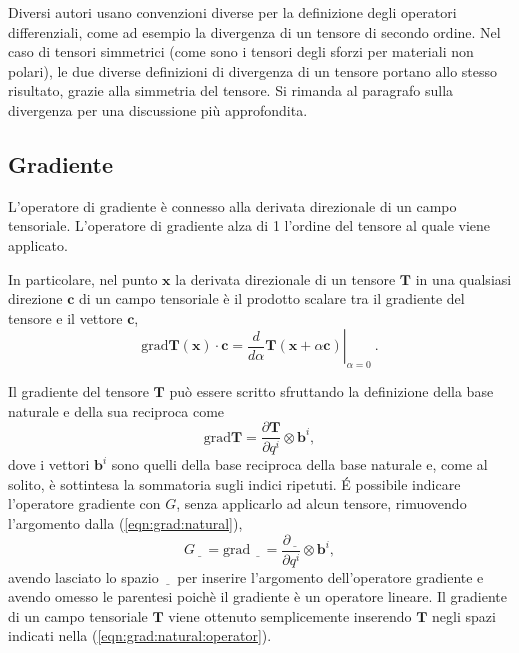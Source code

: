 \begin{remark}
 Diversi autori usano convenzioni diverse per la definizione degli operatori differenziali, come ad esempio la divergenza di un tensore di secondo ordine. Nel caso di tensori simmetrici (come sono i tensori degli sforzi per materiali non polari), le due diverse definizioni di divergenza di un tensore portano allo stesso risultato, grazie alla simmetria del tensore. Si rimanda al paragrafo sulla divergenza per una discussione più approfondita.
\end{remark}

\subsection{Gradiente}
L'operatore di gradiente è connesso alla derivata direzionale di un campo tensoriale.
L'operatore di gradiente alza di 1 l'ordine del tensore al quale viene applicato.
\begin{operator}[Gradiente] 
    In particolare, nel punto $\bm{x}$ la derivata direzionale di un tensore $\bm{T}$ in una qualsiasi direzione $\bm{c}$ di un campo tensoriale è il prodotto scalare tra il gradiente del tensore e il vettore $\bm{c}$,
 \begin{equation}\label{eqn:grad:def}
     \text{grad} \bm{T}(\bm{x}) \cdot \bm{c} = \left. \dfrac{d}{d\alpha} \bm{T}(\bm{x}+\alpha\bm{c})\right|_{\alpha=0} \ .
 \end{equation}
\end{operator}
%

\noindent
Il gradiente del tensore $\bm{T}$ può essere scritto sfruttando la definizione della base naturale e della sua reciproca come
 \begin{equation}\label{eqn:grad:natural}
  \text{grad} \bm{T} = \dfrac{\partial \bm{T}}{\partial q^i} \otimes \bm{b}^i ,
 \end{equation}
dove i vettori $\bm{b}^i$ sono quelli della base reciproca della base naturale e, come al solito, è sottintesa la sommatoria sugli indici ripetuti.
 \'E possibile indicare l'operatore gradiente con $G$, senza applicarlo ad alcun tensore, rimuovendo l'argomento dalla (\ref{eqn:grad:natural}),
 \begin{equation}\label{eqn:grad:natural:operator}
  G \underline{\hspace{8pt}} = \text{grad} \ \underline{\hspace{8pt}} = \dfrac{\partial \underline{\hspace{8pt}}}{\partial q^i} \otimes \bm{b}^i ,
 \end{equation}
 avendo lasciato lo spazio $\underline{\hspace{8pt}}$ per inserire l'argomento dell'operatore gradiente e avendo omesso le parentesi poichè il gradiente è un operatore lineare. Il gradiente di un campo tensoriale $\bm{T}$ viene ottenuto semplicemente inserendo $\bm{T}$ negli spazi indicati nella (\ref{eqn:grad:natural:operator}).

